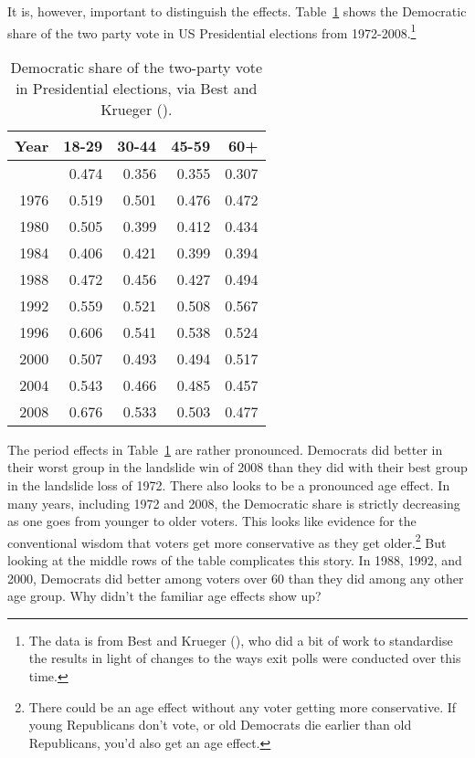 \documentclass[
  11pt,
  letterpaper,
  DIV=11,
  numbers=noendperiod,
  twoside]{scrartcl}
\begin{document}
It is, however, important to distinguish the effects.
Table~\ref{tbl-presidential} shows the Democratic share of the two party
vote in US Presidential elections from 1972-2008.\footnote{The data is
  from Best and Krueger (), who did
  a bit of work to standardise the results in light of changes to the
  ways exit polls were conducted over this time.}

\begin{longtable}[]{@{}rrrrr@{}}

\caption{\label{tbl-presidential}Democratic share of the two-party vote
in Presidential elections, via Best and Krueger
().}

\tabularnewline

\toprule\noalign{}
Year & 18-29 & 30-44 & 45-59 & 60+ \\
\midrule\noalign{}
\endhead
\bottomrule\noalign{}
\endlastfoot
1972 & 0.474 & 0.356 & 0.355 & 0.307 \\
1976 & 0.519 & 0.501 & 0.476 & 0.472 \\
1980 & 0.505 & 0.399 & 0.412 & 0.434 \\
1984 & 0.406 & 0.421 & 0.399 & 0.394 \\
1988 & 0.472 & 0.456 & 0.427 & 0.494 \\
1992 & 0.559 & 0.521 & 0.508 & 0.567 \\
1996 & 0.606 & 0.541 & 0.538 & 0.524 \\
2000 & 0.507 & 0.493 & 0.494 & 0.517 \\
2004 & 0.543 & 0.466 & 0.485 & 0.457 \\
2008 & 0.676 & 0.533 & 0.503 & 0.477 \\

\end{longtable}

The period effects in Table~\ref{tbl-presidential} are rather
pronounced. Democrats did better in their worst group in the landslide
win of 2008 than they did with their best group in the landslide loss of
1972. There also looks to be a pronounced age effect. In many years,
including 1972 and 2008, the Democratic share is strictly decreasing as
one goes from younger to older voters. This looks like evidence for the
conventional wisdom that voters get more conservative as they get
older.\footnote{There could be an age effect without any voter getting
  more conservative. If young Republicans don't vote, or old Democrats
  die earlier than old Republicans, you'd also get an age effect.} But
looking at the middle rows of the table complicates this story. In 1988,
1992, and 2000, Democrats did better among voters over 60 than they did
among any other age group. Why didn't the familiar age effects show up?
\end{document}
